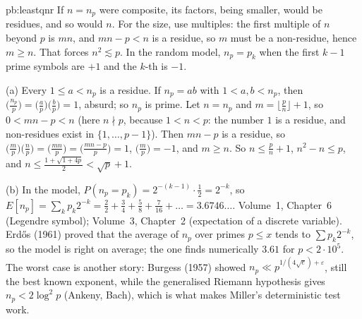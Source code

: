 \begin{solution}{pb:leastqnr}
\idea If $n=n_p$ were composite, its factors, being smaller, would be residues, and so would $n$. For the size, use multiples:
the first multiple of $n$ beyond $p$ is $mn$, and $mn-p<n$ is a residue, so $m$ must be a non-residue, hence $m\ge n$. That forces
$n^2\lesssim p$. In the random model, $n_p=p_k$ when the first $k-1$ prime symbols are $+1$ and the $k$-th is $-1$.

\writeup (a) Every $1\le a<n_p$ is a residue. If $n_p=ab$ with $1<a,b<n_p$, then $\bigl(\frac{n_p}p\bigr)=\bigl(\frac ap\bigr)\bigl(\frac bp\bigr)=1$,
absurd; so $n_p$ is prime. Let $n=n_p$ and $m=\lfloor\frac pn\rfloor+1$, so $0<mn-p<n$ (here $n\nmid p$, because $1<n<p$: the
number $1$ is a residue, and non-residues exist in $\{1,\dots,p-1\}$). Then $mn-p$ is a residue, so
$\bigl(\frac mp\bigr)\bigl(\frac np\bigr)=\bigl(\frac{mn}p\bigr)=\bigl(\frac{mn-p}p\bigr)=1$, $\bigl(\frac mp\bigr)=-1$, and $m\ge n$. So $n\le\frac pn+1$,
$n^2-n\le p$, and $n\le\frac{1+\sqrt{1+4p}}2<\sqrt p+1$.

(b) In the model, $P(n_p=p_k)=2^{-(k-1)}\cdot\frac12=2^{-k}$, so $E[n_p]=\sum_kp_k2^{-k}=\frac22+\frac34+\frac58+\frac7{16}+\dots=3.6746\ldots$.
\tools Volume~1, Chapter~6 (Legendre symbol); Volume~3, Chapter~2 (expectation of a discrete variable).
\leads Erdős (1961) proved that the average of $n_p$ over primes $p\le x$ tends to $\sum p_k2^{-k}$, so the model is right on average; the
one finds numerically $3.61$ for $p<2\cdot10^5$. The worst case is another story: Burgess (1957) showed $n_p\ll p^{1/(4\sqrt e)+\varepsilon}$, still the
best known exponent, while the generalised Riemann hypothesis gives $n_p<2\log^2p$ (Ankeny, Bach), which is what makes Miller's
deterministic test work.
\end{solution}

